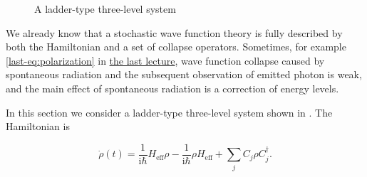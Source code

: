 \documentclass[hyperref, a4paper]{article}
\newcommand*{\ii}{\mathrm{i}}
\newcommand{\lastnote}{\href{12-2.pdf}{the last lecture}}
\begin{document}
\begin{figure}
    \centering
    
    \caption{A ladder-type three-level system}
    \label{fig:ladder-system}
\end{figure}

We already know that a stochastic wave function theory is fully described by both the Hamiltonian and a set 
of collapse operators. Sometimes, for example \eqref{last-eq:polarization} in \lastnote, wave function collapse
caused by spontaneous radiation and the subsequent observation of emitted photon is weak, and the main 
effect of spontaneous radiation is a correction of energy levels.

In this section we consider a ladder-type three-level system shown in .
The Hamiltonian is 

\begin{equation}
    \dot{\rho}(t) = \frac{1}{\ii \hbar} H_\text{eff} \rho - \frac{1}{\ii \hbar} \rho H_\text{eff} + \sum_j C_j \rho C_j^\dagger.
\end{equation}
\end{document}
